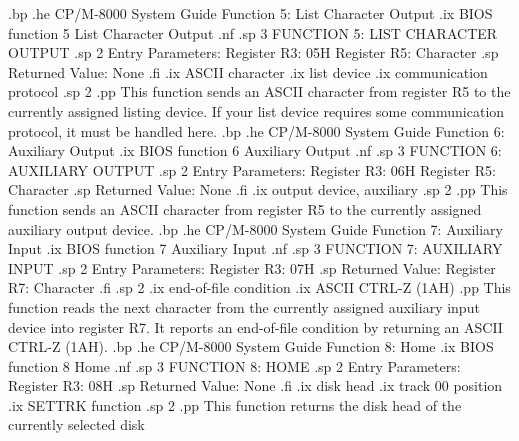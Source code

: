 .bp
.he CP/M-8000 System Guide          Function 5:  List Character Output
.ix BIOS function 5 List Character Output
.nf
.sp 3
               FUNCTION 5:  LIST CHARACTER OUTPUT
.sp 2  
                   Entry Parameters:
                      Register R3: 05H
                      Register R5: Character
.sp
                   Returned   Value: None
.fi
.ix ASCII character
.ix list device
.ix communication protocol
.sp 2
.pp
This function sends an ASCII character from register R5 to the
currently assigned listing device.  If your list device requires some
communication protocol, it must be handled here.
.bp
.he CP/M-8000 System Guide               Function 6:  Auxiliary Output
.ix BIOS function 6 Auxiliary Output
.nf
.sp 3
                  FUNCTION 6:  AUXILIARY OUTPUT
.sp 2 
                   Entry Parameters:
                      Register R3: 06H
                      Register R5: Character
.sp
                   Returned   Value: None
.fi
.ix output device, auxiliary
.sp 2
.pp
This function sends an ASCII character from register R5 to the
currently assigned auxiliary output device.
.bp
.he CP/M-8000 System Guide                Function 7:  Auxiliary Input
.ix BIOS function 7 Auxiliary Input
.nf
.sp 3
                  FUNCTION 7:  AUXILIARY INPUT
.sp 2 
                   Entry Parameters:
                      Register R3: 07H
.sp
                   Returned   Value:
                      Register R7: Character
.fi
.sp 2
.ix end-of-file condition
.ix ASCII CTRL-Z (1AH)
.pp
This function reads the next character from the currently assigned
auxiliary input device into register R7.  It reports an end-of-file condition 
by returning an ASCII CTRL-Z (1AH).
.bp
.he CP/M-8000 System Guide                           Function 8:  Home
.ix BIOS function 8 Home
.nf
.sp 3
                        FUNCTION 8:  HOME
.sp 2 
                     Entry Parameters:
                        Register R3: 08H
.sp
                     Returned   Value: None
.fi
.ix disk head
.ix track 00 position
.ix SETTRK function
.sp 2
.pp
This function returns the disk head of the currently selected disk

